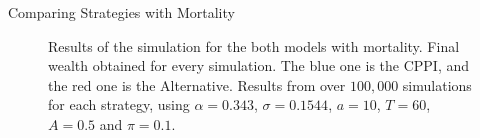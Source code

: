 \documentclass[10pt]{beamer}
\begin{document}
\begin{frame}[fragile]{Comparing Strategies with Mortality}
    \begin{figure}[htbp]
    \centering
    \hfill
    \caption{Results of the simulation for the both models with mortality. Final wealth obtained for every simulation. The blue one is the CPPI, and the red one is the Alternative. Results from over $100,000$ simulations for each strategy, using $\alpha = 0.343$, $\sigma = 0.1544$, $a = 10$, $T = 60$, $A = 0.5$ and $\pi = 0.1$.} \label{fig:1}
  \end{figure}
\end{frame}
\end{document}
